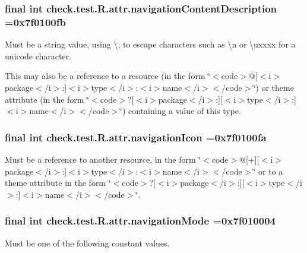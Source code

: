 \subsubsection[{navigation\+Content\+Description}]{\setlength{\rightskip}{0pt plus 5cm}final int check.\+test.\+R.\+attr.\+navigation\+Content\+Description =0x7f0100fb\hspace{0.3cm}{\ttfamily [static]}}\label{classcheck_1_1test_1_1_r_1_1attr_a9bbeac1a500649466bdd64ac1ef20ca8}
Must be a string value, using \textquotesingle{}\textbackslash{};\textquotesingle{} to escape characters such as \textquotesingle{}\textbackslash{}n\textquotesingle{} or \textquotesingle{}\textbackslash{}uxxxx\textquotesingle{} for a unicode character. 

This may also be a reference to a resource (in the form \char`\"{}$<$code$>$@\mbox{[}$<$i$>$package$<$/i$>$\+:\mbox{]}$<$i$>$type$<$/i$>$\+:$<$i$>$name$<$/i$>$$<$/code$>$\char`\"{}) or theme attribute (in the form \char`\"{}$<$code$>$?\mbox{[}$<$i$>$package$<$/i$>$\+:\mbox{]}\mbox{[}$<$i$>$type$<$/i$>$\+:\mbox{]}$<$i$>$name$<$/i$>$$<$/code$>$\char`\"{}) containing a value of this type. \hypertarget{classcheck_1_1test_1_1_r_1_1attr_a180a79b5b65a4ebfd7e0f2e70c5a231a}{}
\subsubsection[{navigation\+Icon}]{\setlength{\rightskip}{0pt plus 5cm}final int check.\+test.\+R.\+attr.\+navigation\+Icon =0x7f0100fa\hspace{0.3cm}{\ttfamily [static]}}\label{classcheck_1_1test_1_1_r_1_1attr_a180a79b5b65a4ebfd7e0f2e70c5a231a}
Must be a reference to another resource, in the form \char`\"{}$<$code$>$@\mbox{[}+\mbox{]}\mbox{[}$<$i$>$package$<$/i$>$\+:\mbox{]}$<$i$>$type$<$/i$>$\+:$<$i$>$name$<$/i$>$$<$/code$>$\char`\"{} or to a theme attribute in the form \char`\"{}$<$code$>$?\mbox{[}$<$i$>$package$<$/i$>$\+:\mbox{]}\mbox{[}$<$i$>$type$<$/i$>$\+:\mbox{]}$<$i$>$name$<$/i$>$$<$/code$>$\char`\"{}. \hypertarget{classcheck_1_1test_1_1_r_1_1attr_a6d552efd1c8cd8a467d4a5441179e7bc}{}
\subsubsection[{navigation\+Mode}]{\setlength{\rightskip}{0pt plus 5cm}final int check.\+test.\+R.\+attr.\+navigation\+Mode =0x7f010004\hspace{0.3cm}{\ttfamily [static]}}\label{classcheck_1_1test_1_1_r_1_1attr_a6d552efd1c8cd8a467d4a5441179e7bc}
Must be one of the following constant values.

